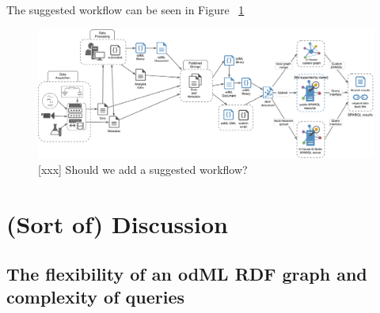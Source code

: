 \documentclass{article}
\begin{document}
The suggested workflow can be seen in Figure ~\ref{fig:workflowSchema}

\begin{figure}
\begin{center}
\includegraphics[width=0.90\columnwidth]{figures/workflowSchema.pdf}
\caption{[xxx] Should we add a suggested workflow?}
\label{fig:workflowSchema}
\end{center}
\end{figure}

\section{(Sort of) Discussion}

\subsection{The flexibility of an odML RDF graph and complexity of queries}
\end{document}
